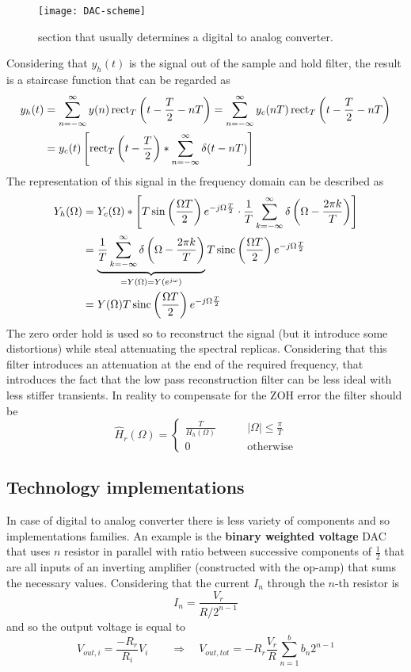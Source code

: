 	\begin{SCfigure}[2][bht]
		\centering \texttt{[image: DAC-scheme]}
		\caption{section that usually determines a digital to analog converter.}
	\end{SCfigure}

	Considering that $y_h(t)$ is the signal out of the sample and hold filter, the result is a staircase function that can be regarded as
	\begin{align*}
		y_h(t) & = \sum_{n=-\infty}^\infty y(n) \,\textrm{rect}_T\left(t-\frac T2 - nT\right) = \sum_{n=-\infty}^\infty y_c(nT) \,\textrm{rect}_T\left(t-\frac T2 - nT\right) \\
		& = y_c(t) \left[ \textrm{rect}_T\left(t-\frac T2\right)*\sum_{n=-\infty}^\infty \delta(t-nT) \right]
	\end{align*}
	The representation of this signal in the frequency domain can be described as
	\begin{align*}
		Y_h(\Omega) & = Y_c(\Omega) * \left[ T \sin \left(\frac{\Omega T}{2}\right) e^{-j\Omega \frac T2} \cdot \frac 1 T \sum_{k=-\infty}^\infty \delta\left(\Omega - \frac{2\pi k}{T}\right) \right] \\
		& = \underbrace{\frac 1 T \sum_{k=-\infty}^\infty \delta\left(\Omega - \frac{2\pi k}{T}\right)}_{= Y(\Omega) = Y\left( e^{j\omega} \right) } T \,\textrm{sinc}\left( \frac{\Omega T}{2} \right) e^{-j\Omega \frac T2} \\
		& = Y(\Omega) T\, \textrm{sinc} \left(\frac{\Omega T}2\right) e^{-j\Omega \frac T 2} 
	\end{align*}
	The zero order hold is used so to reconstruct the signal (but it introduce some distortions) while steal attenuating the spectral replicas. Considering that this filter introduces an attenuation at the end of the required frequency, that introduces the fact that the low pass reconstruction filter can be less ideal with less stiffer transients. In reality to compensate for the ZOH error the filter should be
	\[ \hat H_r(\Omega) = \begin{cases}
		\frac{T}{H_h(\Omega)} \qquad & |\Omega| \leq \frac \pi T \\ 0 & \textrm{otherwise}
	\end{cases} \]
	
	\subsection{Technology implementations}
		In case of digital to analog converter there is less variety of components and so implementations families. An example is the \textbf{binary weighted voltage} DAC that uses $n$ resistor in parallel with ratio between successive components of $\frac 1 2$ that are all inputs of an inverting amplifier (constructed with the op-amp) that sums the necessary values. Considering that the current $I_n$ through the $n$-th resistor is
		\[ I_n = \frac{V_r}{R / 2^{n-1}} \]
		and so the output voltage is equal to
		\[ V_{out,i} = \frac{-R_r}{R_{i}} V_{i} \qquad \Rightarrow \quad V_{out, tot} =  - R_r \frac{V_r}{R} \sum_{n=1}^b b_n 2^{n-1} \]
		
